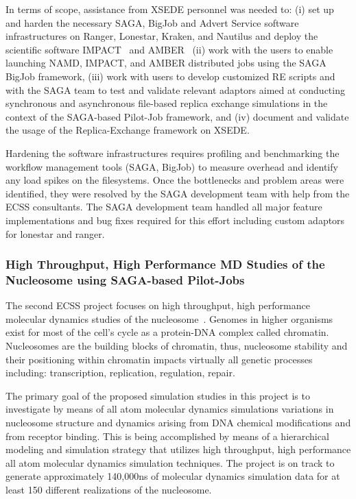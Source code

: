 \documentclass{sig-alternate}
\begin{document}
In terms of scope, assistance from XSEDE personnel was needed to: (i) set up and
harden the necessary SAGA, BigJob and Advert Service software infrastructures on
Ranger, Lonestar, Kraken, and Nautilus and deploy the scientific software
IMPACT~\cite{IMPACT} and AMBER~\cite{AMBER} (ii) work with the
users to enable launching NAMD, IMPACT, and AMBER distributed jobs using the
SAGA BigJob framework, (iii) work with users to develop customized RE scripts
and with the SAGA team to test and validate relevant adaptors aimed at
conducting synchronous and asynchronous ﬁle-based replica exchange simulations
in the context of the SAGA-based Pilot-Job framework, and (iv)  document and
validate the usage of the Replica-Exchange framework on XSEDE.

Hardening the software infrastructures requires profiling and benchmarking the
workflow management tools (SAGA, BigJob) to measure overhead and identify any
load spikes on the filesystems. Once the bottlenecks and problem areas were
identified, they were resolved by the SAGA development team with help from
the ECSS consultants. The SAGA development team handled all major feature
implementations and bug fixes required for this effort including custom
adaptors for lonestar and ranger. 

\subsubsection{High Throughput, High Performance MD Studies of the Nucleosome
using SAGA-based Pilot-Jobs}
The second ECSS project focuses on high throughput, high performance molecular
dynamics studies of the nucleosome~\cite{TomBishop}. Genomes in higher organisms
exist for most of the cell's cycle as a protein-DNA complex called chromatin.
Nucleosomes are the building blocks of chromatin, thus, nucleosome stability and
their positioning within chromatin impacts virtually all genetic processes
including: transcription, replication, regulation, repair.

The primary goal of the proposed simulation studies in this project is to
investigate by means of all atom molecular dynamics simulations variations in
nucleosome structure and dynamics arising from DNA chemical modifications and
from receptor binding. This is being accomplished by means of a hierarchical
modeling and simulation strategy that utilizes high throughput, high
performance all atom molecular dynamics simulation techniques. The project is
on track to generate approximately 140,000ns of molecular dynamics simulation
data for at least 150 different realizations of the nucleosome.
\end{document}
